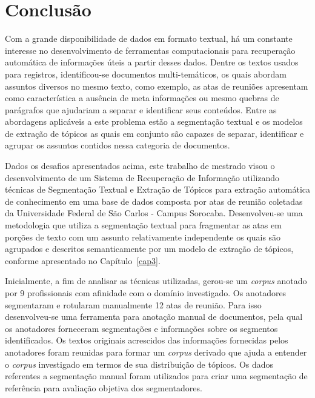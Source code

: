 \chapter{Conclusão}
\label{cap:conclusao}





Com a grande disponibilidade de dados em formato textual, há um constante interesse no desenvolvimento de ferramentas computacionais para recuperação automática de informações úteis a partir desses dados. 
Dentre os textos usados para registros, identificou-se documentos multi-temáticos, os quais abordam assuntos diversos no mesmo texto, como exemplo, as atas de reuniões apresentam como característica a ausência de meta informações ou mesmo quebras de parágrafos que ajudariam a separar e identificar seus conteúdos. 
Entre as abordagens aplicáveis a este problema estão a segmentação textual e os modelos de extração de tópicos as quais em conjunto são capazes de separar, identificar e agrupar os assuntos contidos nessa categoria de documentos.







Dados os desafios apresentados acima, este trabalho de mestrado visou o desenvolvimento de um Sistema de Recuperação de Informação utilizando técnicas de Segmentação Textual e Extração de Tópicos para extração automática de conhecimento em uma base de dados composta por atas de reunião coletadas da Universidade Federal de São Carlos - Campus Sorocaba. 
Desenvolveu-se uma metodologia que utiliza a segmentação textual para fragmentar as atas em porções de texto com um assunto relativamente independente os quais são agrupados e descritos semanticamente por um modelo de extração de tópicos, conforme apresentado no Capítulo~\ref{cap3}.

Inicialmente, a fim de analisar as técnicas utilizadas, gerou-se um \textit{corpus} anotado por 9 profissionais com afinidade com o domínio investigado. Os anotadores segmentaram e rotularam manualmente 12 atas de reunião. 
Para isso desenvolveu-se uma ferramenta para anotação manual de documentos, pela qual os anotadores forneceram segmentações e informações sobre os segmentos identificados.
Os textos originais acrescidos das informações fornecidas pelos anotadores foram reunidas para formar um \textit{corpus} derivado que ajuda a entender o \textit{corpus} investigado em termos de sua distribuição de tópicos. Os dados referentes a segmentação manual foram utilizados para criar uma segmentação de referência para avaliação objetiva dos segmentadores. 

